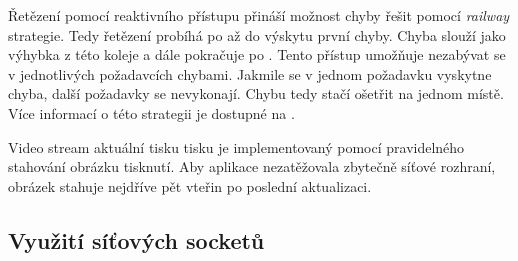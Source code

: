 
Řetězení pomocí reaktivního přístupu přináší možnost chyby řešit pomocí \textit{railway} strategie.
Tedy řetězení probíhá po  až do výskytu první chyby.
Chyba slouží jako výhybka z této koleje a dále pokračuje po .
Tento přístup umožňuje nezabývat se v jednotlivých požadavcích chybami.
Jakmile se v jednom požadavku vyskytne chyba, další požadavky se nevykonají.
Chybu tedy stačí ošetřit na jednom místě.
Více informací o této strategii je dostupné na \cite{fsharp-railway-strategy}.

Video stream aktuální tisku tisku je implementovaný pomocí pravidelného stahování obrázku tisknutí.
Aby aplikace nezatěžovala zbytečně síťové rozhraní, obrázek stahuje nejdříve pět vteřin po poslední aktualizaci.

\subsection{Využití síťových socketů}

